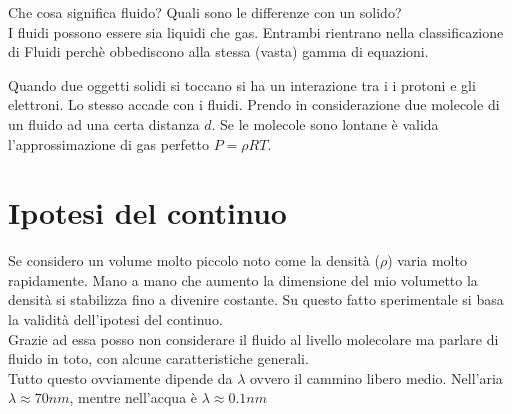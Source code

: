 
Che cosa significa fluido? Quali sono le differenze con un solido?\\
I fluidi possono essere sia liquidi che gas.
Entrambi rientrano nella classificazione di Fluidi perchè obbediscono alla stessa (vasta) gamma di equazioni.
\begin{figure}[H]
    \centering
  \end{figure}
  Quando due oggetti solidi si toccano si ha un interazione tra i i protoni e gli elettroni.
  Lo stesso accade con i fluidi.
  Prendo in considerazione due molecole di un fluido ad una certa distanza $d$.
  Se le molecole sono lontane è valida l'approssimazione di gas perfetto $P=\rho RT$.\\
  \section{Ipotesi del continuo}
  Se considero un volume molto piccolo noto come la densità ($\rho$) varia molto rapidamente.
  Mano a mano che aumento la dimensione del mio volumetto la densità si stabilizza fino a divenire costante.
  Su questo fatto sperimentale si basa la validità dell'ipotesi del continuo.\\
  Grazie ad essa posso non considerare il fluido al livello molecolare ma parlare di fluido in toto, con alcune caratteristiche generali.\\
  Tutto questo ovviamente dipende da $ \lambda  $ ovvero il cammino libero medio.
  Nell'aria $ \lambda \approx 70 \unit{nm} $, mentre nell'acqua è $ \lambda \approx 0.1 \unit{nm}$\\
